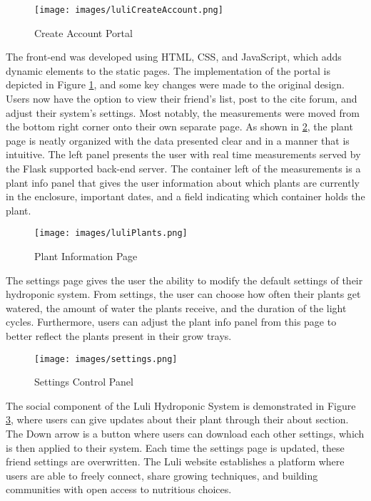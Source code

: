 \documentclass[12pt]{article} %
\begin{document}
  
  \begin{figure}[H]
    \centering
    \texttt{[image: images/luliCreateAccount.png]}
    \caption{Create Account Portal}
    \label{fig: create account}
  \end{figure}
  
  The front-end was developed using HTML, CSS, and JavaScript, which adds dynamic elements to the static pages. The implementation of the portal is depicted in Figure \ref{fig: create account}, and some key changes were made to the original design. Users now have the option to view their friend's list, post to the cite forum, and adjust their system's settings. Most notably, the measurements were moved from the bottom right corner onto their own separate page. As shown in \ref{fig: plant page}, the plant page is neatly organized with the data presented clear and in a manner that is intuitive. The left panel presents the user with real time measurements served by the Flask supported back-end server. The container left of the measurements is a plant info panel that gives the user information about which plants are currently in the enclosure, important dates, and a field indicating which container holds the plant. 
  
  \begin{figure}[H]
    \centering
    \texttt{[image: images/luliPlants.png]}
    \caption{Plant Information Page}
    \label{fig: plant page}
  \end{figure}
  
  The settings page gives the user the ability to modify the default settings of their hydroponic system. From settings, the user can choose how often their plants get watered, the amount of water the plants receive, and the duration of the light cycles. Furthermore, users can adjust the plant info panel from this page to better reflect the plants present in their grow trays.
  
  \begin{figure}[H]
    \centering
    \texttt{[image: images/settings.png]}
    \caption{Settings Control Panel}
    \label{fig: friends page}
  \end{figure}
  
  The social component of the Luli Hydroponic System is demonstrated in Figure \ref{fig: friends page}, where users can give updates about their plant through their about section. The Down arrow is a button where users can download each other settings, which is then applied to their system. Each time the settings page is updated, these friend settings are overwritten. The Luli website establishes a platform where users are able to freely connect, share growing techniques, and building communities with open access to nutritious choices. 
  
\end{document}
